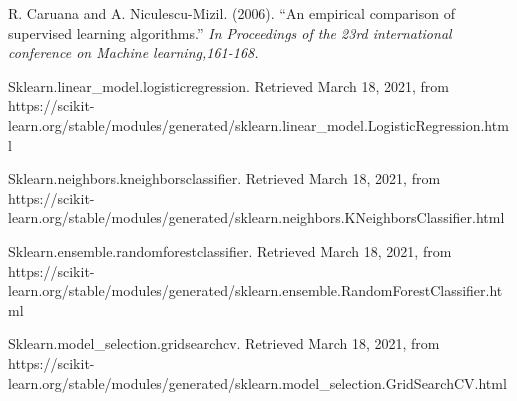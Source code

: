 \documentclass[twoside,11pt]{article}
\begin{document}
\vskip 0.2in
\begin{thebibliography}{5}

R. Caruana and A. Niculescu-Mizil. (2006).
``An empirical comparison of supervised learning algorithms.” 
\textit{In Proceedings of the 23rd international conference on Machine learning,161-168.}

Sklearn.linear\_model.logisticregression. Retrieved March 18, 2021, from https://scikit-learn.org/stable/modules/generated/sklearn.linear\_model.LogisticRegression.html

Sklearn.neighbors.kneighborsclassifier. Retrieved March 18, 2021, from https://scikit-learn.org/stable/modules/generated/sklearn.neighbors.KNeighborsClassifier.html

Sklearn.ensemble.randomforestclassifier. Retrieved March 18, 2021, from https://scikit-learn.org/stable/modules/generated/sklearn.ensemble.RandomForestClassifier.html

Sklearn.model\_selection.gridsearchcv. Retrieved March 18, 2021, from https://scikit-learn.org/stable/modules/generated/sklearn.model\_selection.GridSearchCV.html

\end{thebibliography}
\end{document}
